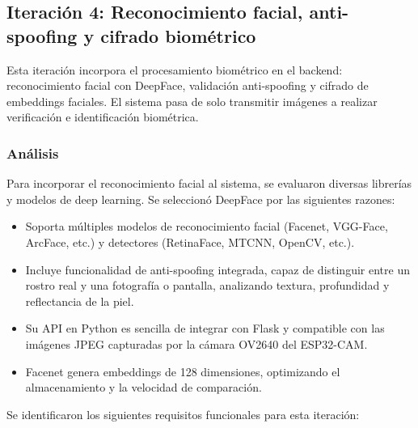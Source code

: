 
\subsection{Iteración 4: Reconocimiento facial, anti-spoofing y cifrado biométrico}

Esta iteración incorpora el procesamiento biométrico en el backend: reconocimiento facial con DeepFace, validación anti-spoofing y cifrado de embeddings faciales. El sistema pasa de solo transmitir imágenes a realizar verificación e identificación biométrica.

\subsubsection{Análisis}

Para incorporar el reconocimiento facial al sistema, se evaluaron diversas librerías y modelos de deep learning. Se seleccionó DeepFace por las siguientes razones:

\begin{itemize}
    \item Soporta múltiples modelos de reconocimiento facial (Facenet, VGG-Face, ArcFace, etc.) y detectores (RetinaFace, MTCNN, OpenCV, etc.).
    \item Incluye funcionalidad de anti-spoofing integrada, capaz de distinguir entre un rostro real y una fotografía o pantalla, analizando textura, profundidad y reflectancia de la piel.
    \item Su API en Python es sencilla de integrar con Flask y compatible con las imágenes JPEG capturadas por la cámara OV2640 del ESP32-CAM.
    \item Facenet genera embeddings de 128 dimensiones, optimizando el almacenamiento y la velocidad de comparación.
\end{itemize}

Se identificaron los siguientes requisitos funcionales para esta iteración:

